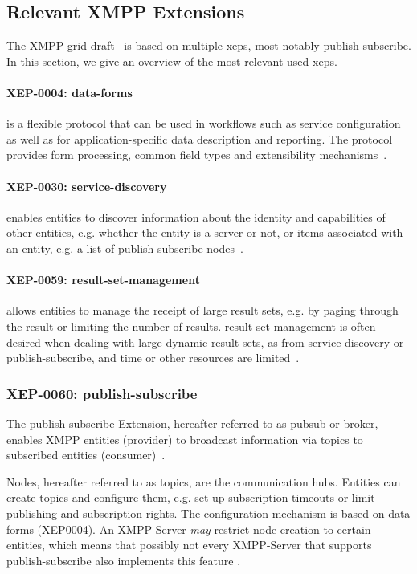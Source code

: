 \subsection{Relevant XMPP Extensions}

The XMPP grid draft~\cite{ietf-mile-xmpp-grid-05} is based on multiple \glspl{xep}, most notably \gls{publish-subscribe}. In this section, we give an overview of the most relevant used \glspl{xep}.

\paragraph{XEP-0004: \gls{data-forms}} is a flexible protocol that can be used in workflows such as service configuration as well as for application-specific data description and reporting. The protocol provides form processing, common field types and extensibility mechanisms~\cite{xep-0004}.

\paragraph{XEP-0030: \gls{service-discovery}} enables entities to discover information about the identity and capabilities of other entities, e.g. whether the entity is a server or not, or items associated with an entity, e.g. a list of \gls{publish-subscribe} nodes~\cite{xep-0030}.

\paragraph{XEP-0059: \Gls{result-set-management}} allows entities to manage the receipt of large result sets, e.g. by paging through the result or limiting the number of results. \gls{result-set-management} is often desired when dealing with large dynamic result sets, as from service discovery or publish-subscribe, and time or other resources are limited~\cite{xep-0059}.

\subsubsection{XEP-0060: \Gls{publish-subscribe}}
The \gls{publish-subscribe} Extension, hereafter referred to as \gls{pubsub} or \gls{broker}, enables XMPP entities (\gls{provider}) to broadcast information via \glspl{topic} to subscribed entities (\gls{consumer})~\cite{xep-0060}.

Nodes, hereafter referred to as \glspl{topic}, are the communication hubs. Entities can create topics and configure them, e.g. set up subscription timeouts or limit publishing and subscription rights. The configuration mechanism is based on data forms (XEP0004). An XMPP-Server \emph{may} restrict node creation to certain entities, which means that possibly not every XMPP-Server that supports \gls{publish-subscribe} also implements this feature \cite{rfc2119}.

